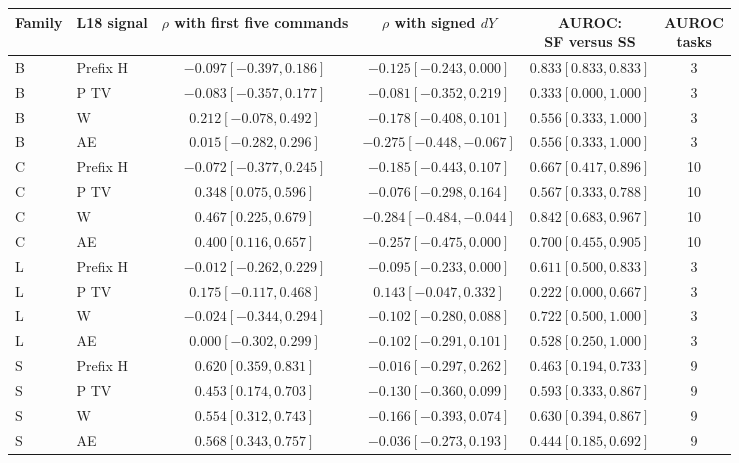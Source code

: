 \begin{table}[t]
\centering\normalsize
\setlength{\tabcolsep}{3.1pt}
\begin{tabular}{@{}llcccc@{}}
\toprule
Family & L18 signal & \shortstack{$\rho$ with first\\five commands} & \shortstack{$\rho$ with\\signed $dY$} & \shortstack{AUROC:\\SF versus SS} & \shortstack{AUROC\\tasks}\\
\midrule
B & Prefix H & $-0.097[-0.397,0.186]$ & $-0.125[-0.243,0.000]$ & $0.833[0.833,0.833]$ & 3\\
B & P TV & $-0.083[-0.357,0.177]$ & $-0.081[-0.352,0.219]$ & $0.333[0.000,1.000]$ & 3\\
B & W & $0.212[-0.078,0.492]$ & $-0.178[-0.408,0.101]$ & $0.556[0.333,1.000]$ & 3\\
B & AE & $0.015[-0.282,0.296]$ & $-0.275[-0.448,-0.067]$ & $0.556[0.333,1.000]$ & 3\\
\midrule
C & Prefix H & $-0.072[-0.377,0.245]$ & $-0.185[-0.443,0.107]$ & $0.667[0.417,0.896]$ & 10\\
C & P TV & $0.348[0.075,0.596]$ & $-0.076[-0.298,0.164]$ & $0.567[0.333,0.788]$ & 10\\
C & W & $0.467[0.225,0.679]$ & $-0.284[-0.484,-0.044]$ & $0.842[0.683,0.967]$ & 10\\
C & AE & $0.400[0.116,0.657]$ & $-0.257[-0.475,0.000]$ & $0.700[0.455,0.905]$ & 10\\
\midrule
L & Prefix H & $-0.012[-0.262,0.229]$ & $-0.095[-0.233,0.000]$ & $0.611[0.500,0.833]$ & 3\\
L & P TV & $0.175[-0.117,0.468]$ & $0.143[-0.047,0.332]$ & $0.222[0.000,0.667]$ & 3\\
L & W & $-0.024[-0.344,0.294]$ & $-0.102[-0.280,0.088]$ & $0.722[0.500,1.000]$ & 3\\
L & AE & $0.000[-0.302,0.299]$ & $-0.102[-0.291,0.101]$ & $0.528[0.250,1.000]$ & 3\\
\midrule
S & Prefix H & $0.620[0.359,0.831]$ & $-0.016[-0.297,0.262]$ & $0.463[0.194,0.733]$ & 9\\
S & P TV & $0.453[0.174,0.703]$ & $-0.130[-0.360,0.099]$ & $0.593[0.333,0.867]$ & 9\\
S & W & $0.554[0.312,0.743]$ & $-0.166[-0.393,0.074]$ & $0.630[0.394,0.867]$ & 9\\
S & AE & $0.568[0.343,0.757]$ & $-0.036[-0.273,0.193]$ & $0.444[0.185,0.692]$ & 9\\
\bottomrule
\end{tabular}

\label{tab:supp-internal-links}
\end{table}

